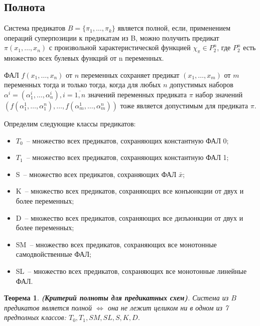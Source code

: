 \documentclass[12pt]{article}
\newtheorem{theorem}{Теорема}[section]
\newenvironment{definition}[1][Определение]{\begin{trivlist}
\item[\hskip \labelsep {\bfseries #1}]}{\end{trivlist}}
\begin{document}
\subsection{Полнота}

\begin{definition}
Система предикатов $B = \{ \pi_1, \dots, \pi_k \}$ является полной, если, 
применением операций суперпозиции к предикатам из B, можно получить 
предикат $\pi(x_1, \dots, x_n)$ с произвольной характеристической 
функцией $\chi_{\pi} \in P_2^n$, где $P_2^n$ есть множество всех булевых функций от n переменных.
\end{definition}

\begin{definition} ФАЛ
$f (x_1, \ldots, x_n)$ от $n$ переменных сохраняет предикат $ (x_1, \ldots, x_m)$ от $m$
переменных тогда и только тогда, когда для любых $n$ допустимых наборов $\alpha^i = (\alpha_1^i, \ldots, \alpha_n^i), 
i = \overline{1, n}$ значений переменных предиката $\pi$ набор
значений $( f(\alpha_1^1, \ldots, \alpha_1^n), \ldots, f(\alpha_m^1, \ldots, \alpha_m^n) )$
тоже является допустимым для предиката $\pi$.
\end{definition}

Определим следующие классы предикатов:
\begin{itemize}
    \item{$T_0$}~-- множество всех предикатов, сохраняющих константную ФАЛ 0;
    \item{$T_1$}~-- множество всех предикатов, сохраняющих константную ФАЛ 1;
    \item{S}~-- множество всех предикатов, сохраняющих ФАЛ $\bar{x}$;
    \item{K}~-- множество всех предикатов, сохраняющих все конъюнкции от двух и более переменных;
    \item{D}~-- множество всех предикатов, сохраняющих все дизъюнкции от двух и более переменных;
    \item{SM}~-- множество всех предикатов, сохраняющих все монотонные самодвойственные ФАЛ;
    \item{SL}~-- множество всех предикатов, сохраняющих все монотонные линейные ФАЛ.
\end{itemize}

\begin{theorem}
\label{Post}
\textbf{(Критерий полноты для предикатных схем)}. Система из $B$ предикатов является полной $\iff$
она не лежит целиком ни в одном из 7 предполных классов: $T_0, T_1, SM, SL, S, K, D$. \cite{Shu11} 
\end{theorem}
\end{document}
